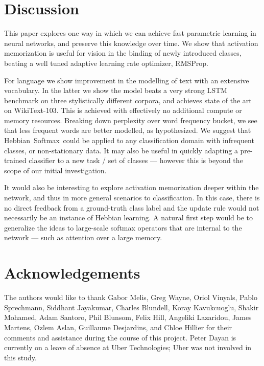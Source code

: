 \documentclass{article} \usepackage{hyperref}
\newcommand{\model}{\hbox{Hebbian Softmax }}
\begin{document}
\section{Discussion}
This paper explores one way in which we can achieve fast parametric learning in neural networks, and preserve this knowledge over time. We show that activation memorization is useful for vision in the binding of newly introduced classes, beating a well tuned adaptive learning rate optimizer, RMSProp. 

For language we show improvement in the modelling of text with an extensive vocabulary. In the latter we show the model beats a very strong LSTM benchmark on three stylistically different corpora, and achieves state of the art on WikiText-103. This is achieved with effectively no additional compute or memory resources. Breaking down perplexity over word frequency bucket, we see that less frequent words are better modelled, as hypothesized. We suggest that \model could be applied to any classification domain with infrequent classes, or non-stationary data. It may also be useful in quickly adapting a pre-trained classifier to a new task / set of classes --- however this is beyond the scope of our initial investigation.

It would also be interesting to explore activation memorization deeper within the network, and thus in more general scenarios to classification. In this case, there is no direct feedback from a ground-truth class label and the update rule would not necessarily be an instance of Hebbian learning. A natural first step would be to generalize the ideas to large-scale softmax operators that are internal to the network --- such as attention over a large memory.

\section*{Acknowledgements}

The authors would like to thank Gabor Melis, Greg Wayne, Oriol Vinyals, Pablo Sprechmann, Siddhant Jayakumar, Charles Blundell, Koray Kavukcuoglu, Shakir Mohamed, Adam Santoro, Phil Blunsom, Felix Hill, Angeliki Lazaridou, James Martens, Ozlem Aslan, Guillaume Desjardins, and Chloe Hillier for their comments and assistance during the course of this project. Peter Dayan is currently on a leave of absence at Uber Technologies; Uber was not involved in this study.

\newpage 



\end{document}
